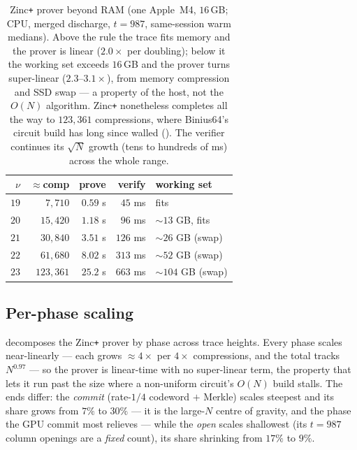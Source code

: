 \begin{table}[h]
\centering
\renewcommand{\arraystretch}{1.2}
\begin{tabular}{r r r r l}
\toprule
$\nu$ & $\approx$comp & prove & verify & working set \\
\midrule
$19$ & $7{,}710$   & $0.59$ s  & $45$ ms  & fits \\
$20$ & $15{,}420$  & $1.18$ s  & $96$ ms  & $\sim\!13$ GB, fits \\
\midrule
$21$ & $30{,}840$  & $3.51$ s  & $126$ ms & $\sim\!26$ GB (swap) \\
$22$ & $61{,}680$  & $8.02$ s  & $313$ ms & $\sim\!52$ GB (swap) \\
$23$ & $123{,}361$ & $25.2$ s  & $663$ ms & $\sim\!104$ GB (swap) \\
\bottomrule
\end{tabular}
\caption{Zinc\texttt{+} prover beyond RAM (one Apple~M4, $16$\,GB; CPU, merged
discharge, $t=987$, same-session warm medians). Above the rule the trace fits
memory and the prover is linear ($2.0\times$ per doubling); below it the working
set exceeds $16$\,GB and the prover turns super-linear ($2.3$--$3.1\times$),
from memory compression and SSD swap --- a property of the host, not the $O(N)$
algorithm. Zinc\texttt{+} nonetheless completes all the way to $123{,}361$
compressions, where Binius64's circuit build has long since walled
(). The verifier continues its $\sqrt N$ growth (tens to
hundreds of ms) across the whole range.}
\label{tab:scaling-bigmem}
\end{table}

\subsection{Per-phase scaling}
\label{sec:impl-perphase}\label{sec:res-phases}

 decomposes the Zinc\texttt{+} prover by phase across trace
heights. Every phase scales near-linearly --- each grows $\approx\!4\times$ per
$4\times$ compressions, and the total tracks $N^{0.97}$ --- so the prover is
linear-time with no super-linear term, the property that lets it run past the
size where a non-uniform circuit's $O(N)$ build stalls. The ends differ: the
\emph{commit} (rate-$1/4$ codeword $+$ Merkle) scales steepest and its share
grows from $7\%$ to $30\%$ --- it is the large-$N$ centre of gravity, and the
phase the GPU commit most relieves --- while the \emph{open} scales shallowest
(its $t=987$ column openings are a \emph{fixed} count), its share shrinking
from $17\%$ to $9\%$.

